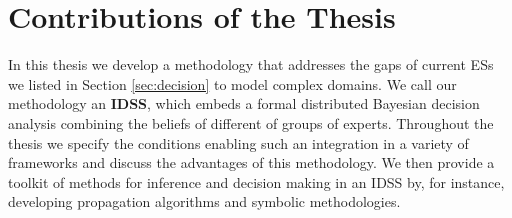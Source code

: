 \section{Contributions of the Thesis}
\label{sec:contributions}
In this thesis we develop a methodology that addresses the gaps of current ESs we listed in Section \ref{sec:decision} to model complex domains. We call our methodology an \textbf{IDSS}, which embeds a formal distributed Bayesian decision analysis combining the beliefs of different of groups of experts. Throughout the thesis we specify the conditions enabling such an integration in a variety of frameworks and discuss the advantages of this methodology. We then provide a toolkit of methods for inference and decision making in an IDSS by, for instance, developing propagation algorithms and symbolic methodologies.

